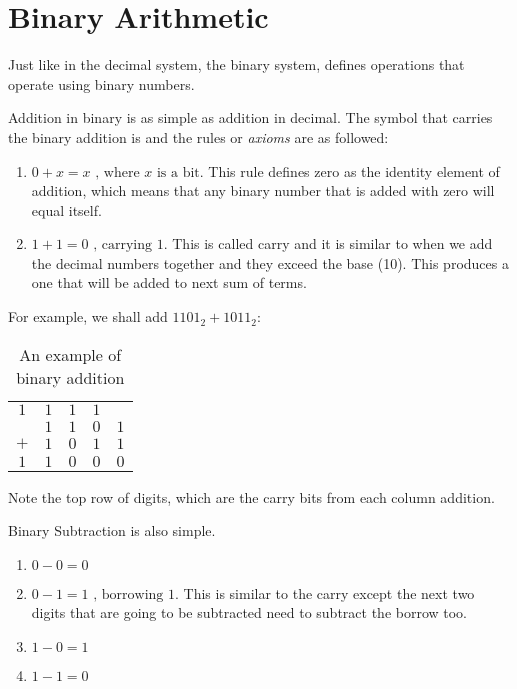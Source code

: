 \section{Binary Arithmetic}

Just like in the decimal system, the binary system, defines operations that operate
using binary numbers.

Addition in binary is as simple as addition in decimal. The symbol that carries the
binary addition is \say{$+$} and the rules or \textit{axioms} are as followed:

\begin{enumerate}
    \item $0 + x = x\text{ , where $x$ is a bit}$. This rule defines zero as the
    identity element of addition, which means that any binary number that is
    added with zero will equal itself.
    \item $1 + 1 = 0\text{ , carrying 1}$. This is called carry
    and it is similar to when we add the decimal numbers together and they
    exceed the base (10). This produces a one that will be added to next
    sum of terms.
\end{enumerate}

For example, we shall add $1101_2 + 1011_2$:

\begin{table}[ht]
    \centering
    \begin{tabular}{c cccc}
        $1$ & $1$   & $1$  & $1$  & \\
        $ $ & $1$  & $1$ & $0$ & $1$ \\
        $+$ & $1$ & $0$ & $1$ & $1$ \\
        \hline
        $1$ & $1$ & $0$ & $0$ & $0$ \\
    \end{tabular}
    \caption{An example of binary addition}
\end{table}

Note the top row of digits, which are the carry bits from each column addition.

Binary Subtraction is also simple.

\begin{enumerate}
    \item $0 - 0 = 0$
    \item $0 - 1 = 1\text{ , borrowing }1$. This is similar to the carry except
    the next two digits that are going to be subtracted need to subtract the borrow too.
    \item $1 - 0 = 1$
    \item $1 - 1 = 0$
\end{enumerate}


